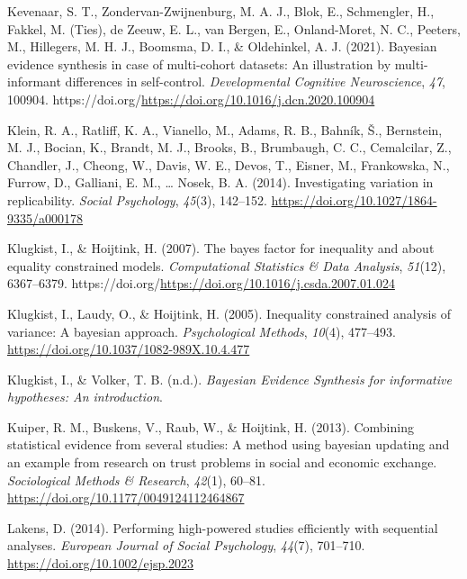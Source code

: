 \documentclass[
]{interact}
\newlength{\cslhangindent}
\newlength{\cslentryspacingunit} %
\newenvironment{CSLReferences}[2] %
 {%
  \setlength{\parindent}{0pt}
  \ifodd #1
  \let\oldpar\par
  \def\par{\hangindent=\cslhangindent\oldpar}
  \fi
  \setlength{\parskip}{#2\cslentryspacingunit}
 }%
 {}
\begin{document}
\begin{CSLReferences}{1}{0}
\leavevmode{}%
Kevenaar, S. T., Zondervan-Zwijnenburg, M. A. J., Blok, E., Schmengler,
H., Fakkel, M. (Ties), de Zeeuw, E. L., van Bergen, E., Onland-Moret, N.
C., Peeters, M., Hillegers, M. H. J., Boomsma, D. I., \& Oldehinkel, A.
J. (2021). Bayesian evidence synthesis in case of multi-cohort datasets:
An illustration by multi-informant differences in self-control.
\emph{Developmental Cognitive Neuroscience}, \emph{47}, 100904.
https://doi.org/\url{https://doi.org/10.1016/j.dcn.2020.100904}

\leavevmode{}%
Klein, R. A., Ratliff, K. A., Vianello, M., Adams, R. B., Bahník, Š.,
Bernstein, M. J., Bocian, K., Brandt, M. J., Brooks, B., Brumbaugh, C.
C., Cemalcilar, Z., Chandler, J., Cheong, W., Davis, W. E., Devos, T.,
Eisner, M., Frankowska, N., Furrow, D., Galliani, E. M., \ldots{} Nosek,
B. A. (2014). Investigating variation in replicability. \emph{Social
Psychology}, \emph{45}(3), 142--152.
\url{https://doi.org/10.1027/1864-9335/a000178}

\leavevmode{}%
Klugkist, I., \& Hoijtink, H. (2007). The bayes factor for inequality
and about equality constrained models. \emph{Computational Statistics \&
Data Analysis}, \emph{51}(12), 6367--6379.
https://doi.org/\url{https://doi.org/10.1016/j.csda.2007.01.024}

\leavevmode{}%
Klugkist, I., Laudy, O., \& Hoijtink, H. (2005). Inequality constrained
analysis of variance: A bayesian approach. \emph{Psychological Methods},
\emph{10}(4), 477--493. \url{https://doi.org/10.1037/1082-989X.10.4.477}

\leavevmode{}%
Klugkist, I., \& Volker, T. B. (n.d.). \emph{{B}ayesian {E}vidence
{S}ynthesis for informative hypotheses: An introduction}.

\leavevmode{}%
Kuiper, R. M., Buskens, V., Raub, W., \& Hoijtink, H. (2013). Combining
statistical evidence from several studies: A method using bayesian
updating and an example from research on trust problems in social and
economic exchange. \emph{Sociological Methods \& Research},
\emph{42}(1), 60--81. \url{https://doi.org/10.1177/0049124112464867}

\leavevmode{}%
Lakens, D. (2014). Performing high-powered studies efficiently with
sequential analyses. \emph{European Journal of Social Psychology},
\emph{44}(7), 701--710. \url{https://doi.org/10.1002/ejsp.2023}


\end{CSLReferences}
\end{document}
